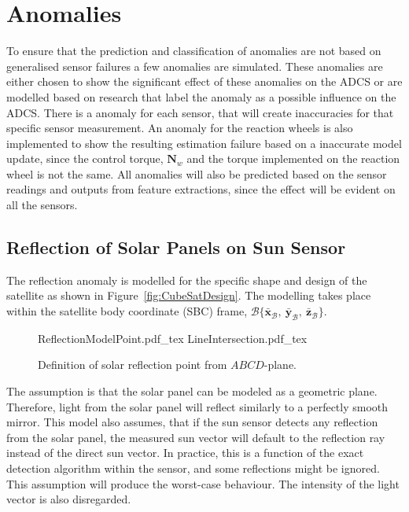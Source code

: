 \chapter{Anomalies}
\label{chap:Anomalies}
To ensure that the prediction and classification of anomalies are not based on generalised sensor failures a few anomalies are simulated. These anomalies are either chosen to show the significant effect of these anomalies on the ADCS or are modelled based on research that label the anomaly as a possible influence on the ADCS. There is a anomaly for each sensor, that will create inaccuracies for that specific sensor measurement. An anomaly for the reaction wheels is also implemented to show the resulting estimation failure based on a inaccurate model update, since the control torque, $\mathbf{N}_w$ and the torque implemented on the reaction wheel is not the same. All anomalies will also be predicted based on the sensor readings and outputs from feature extractions, since the effect will be evident on all the sensors.

\section{Reflection of Solar Panels on Sun Sensor}
\label{section:Reflection}
The reflection anomaly is modelled for the specific shape and design of the satellite as shown in Figure~\ref{fig:CubeSatDesign}.  The modelling takes place within the satellite body coordinate (SBC) frame, $\mathcal{B}\{\bar{\mathbf{x}}_{\mathcal{B}},~\bar{\mathbf{y}}_{\mathcal{B}},~\bar{\mathbf{z}}_{\mathcal{B}}\}$.


\begin{figure*}[h!t!b]
	\centering
	\def\svgwidth{7cm}
	{ReflectionModelPoint.pdf_tex}
	\centering
	\def\svgwidth{7cm}
	{LineIntersection.pdf_tex}
	\caption{Definition of solar reflection point from $ABCD$-plane.}
	\label{fig:LineIntersection}
\end{figure*}

The assumption is that the solar panel can be modeled as a geometric plane. Therefore, light from the solar panel will reflect similarly to a perfectly smooth mirror. This model also assumes, that if the sun sensor detects any reflection from the solar panel, the measured sun vector will default to the reflection ray instead of the direct sun vector. In practice, this is a function of the exact detection algorithm within the sensor, and some reflections might be ignored.  This assumption will produce the worst-case behaviour.  The intensity of the light vector is also disregarded.

